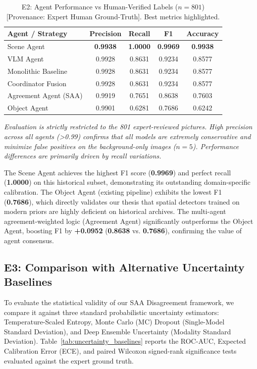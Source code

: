 \documentclass[12pt,onecolumn,a4paper]{IEEEtran}
\begin{document}
\begin{table}[!htbp]
\centering
\caption{E2: Agent Performance vs Human-Verified Labels ($n=801$) [Provenance: Expert Human Ground-Truth]. Best metrics highlighted.}
\label{tab:gold_eval_e2}
\begin{tabular}{lcccc}
\toprule
Agent / Strategy & Precision & Recall & F1 & Accuracy \\
\midrule
Scene Agent             & \textbf{0.9938} & \textbf{1.0000} & \textbf{0.9969} & \textbf{0.9938} \\
VLM Agent               & 0.9928 & 0.8631 & 0.9234 & 0.8577 \\
Monolithic Baseline     & 0.9928 & 0.8631 & 0.9234 & 0.8577 \\
Coordinator Fusion      & 0.9928 & 0.8631 & 0.9234 & 0.8577 \\
Agreement Agent (SAA)   & 0.9919 & 0.7651 & 0.8638 & 0.7603 \\
Object Agent            & 0.9901 & 0.6281 & 0.7686 & 0.6242 \\
\bottomrule
\end{tabular}
\begin{flushleft}
\small{\textit{Evaluation is strictly restricted to the 801 expert-reviewed pictures. High precision across all agents (>0.99) confirms that all models are extremely conservative and minimize false positives on the background-only images ($n=5$). Performance differences are primarily driven by recall variations.}}
\end{flushleft}
\end{table}

The Scene Agent achieves the highest F1 score (\textbf{0.9969}) and perfect recall (\textbf{1.0000}) on this historical subset, demonstrating its outstanding domain-specific calibration. The Object Agent (existing pipeline) exhibits the lowest F1 (\textbf{0.7686}), which directly validates our thesis that spatial detectors trained on modern priors are highly deficient on historical archives. The multi-agent agreement-weighted logic (Agreement Agent) significantly outperforms the Object Agent, boosting F1 by \textbf{+0.0952} (\textbf{0.8638} vs. \textbf{0.7686}), confirming the value of agent consensus.

\subsection{E3: Comparison with Alternative Uncertainty Baselines}
To evaluate the statistical validity of our SAA Disagreement framework, we compare it against three standard probabilistic uncertainty estimators: Temperature-Scaled Entropy, Monte Carlo (MC) Dropout (Single-Model Standard Deviation), and Deep Ensemble Uncertainty (Modality Standard Deviation). Table~\ref{tab:uncertainty_baselines} reports the ROC-AUC, Expected Calibration Error (ECE), and paired Wilcoxon signed-rank significance tests evaluated against the expert ground truth.
\end{document}
